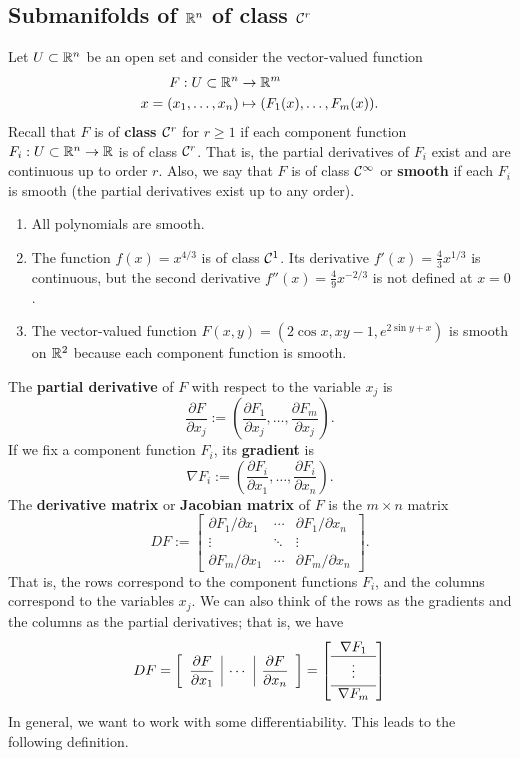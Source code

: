 \subsection{Submanifolds of $\mathbb{R}^n$ of class ${\cal C}^r$} \label{subsec:1.4}
Let $U \subset \mathbb{R}^n$ be an open set and consider the vector-valued function 
\begin{align*}
    F : U \subset \mathbb{R}^n &\to \mathbb{R}^m \\ 
    x = (x_1, \dots, x_n) &\mapsto (F_1(x), \dots, F_m(x)). 
\end{align*}
Recall that $F$ is of {\bf class ${\cal C}^r$} for $r \geq 1$ if each component 
function $F_i : U \subset \mathbb{R}^n \to \mathbb{R}$ is of class ${\cal C}^r$. That is, 
the partial derivatives of $F_i$ exist and are continuous up to order $r$. 
Also, we say that $F$ is of class ${\cal C}^\infty$ or {\bf smooth} if each 
$F_i$ is smooth (the partial derivatives exist up to any order).
\begin{enumerate}[(1)]
    \item All polynomials are smooth. 
    \item The function $f(x) = x^{4/3}$ is of class ${\cal C}^1$. Its derivative 
    $f'(x) = \frac43 x^{1/3}$ is continuous, but the second derivative 
    $f''(x) = \frac49 x^{-2/3}$ is not defined at $x = 0$. 
    \item The vector-valued function $F(x, y) = (2\cos x, xy - 1, e^{2\sin y+x})$ 
    is smooth on $\mathbb{R}^2$ because each component function is smooth. 
\end{enumerate}
The {\bf partial derivative} of $F$ with respect to the variable $x_j$ is 
\[ \frac{\partial F}{\partial x_j} := \left( \frac{\partial F_1}{\partial x_j}, 
\dots, \frac{\partial F_m}{\partial x_j} \right). \] 
If we fix a component function $F_i$, its {\bf gradient} is 
\[ \nabla F_i := \left( \frac{\partial F_i}{\partial x_1}, 
\dots, \frac{\partial F_i}{\partial x_n} \right). \] 
The {\bf derivative matrix} or {\bf Jacobian matrix} of $F$ is the $m \times n$ 
matrix 
\[ DF := \begin{bmatrix} 
    \partial F_1/\partial x_1 & \cdots & \partial F_1/\partial x_n \\ 
    \vdots & \ddots & \vdots \\ 
    \partial F_m/\partial x_1 & \cdots & \partial F_m/\partial x_n
\end{bmatrix}. \] 
That is, the rows correspond to the component functions $F_i$, and the 
columns correspond to the variables $x_j$. We can also think of the 
rows as the gradients and the columns as the partial derivatives; that is, 
we have 
\[ DF = \mleft[ \begin{array}{c|c|c}
    \dfrac{\partial F}{\partial x_1} & \cdots & \dfrac{\partial F}{\partial x_n}
\end{array} \mright] = \mleft[ \begin{array}{c}
    \nabla F_1 \\ \hline 
    \vdots \\[2pt] \hline 
    \nabla F_m \\
\end{array} \mright] \] 
In general, we want to work with some differentiability. 
This leads to the following definition. 

